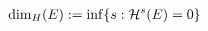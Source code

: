\documentclass[preview]{standalone}
\begin{document}
\begin{align*}
\dim_H(E) := \inf\{ s : \mathcal{H}^s(E) = 0\} \hspace{2.85 cm}
\end{align*}
\end{document}
